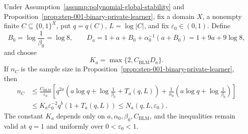 \begin{lemma}
\label{lem:step-002-sc-domination}
Under Assumption~\ref{assump:polynomial-global-stability} and
Proposition~\ref{prop:step-001-binary-private-learner}, fix a domain
\(X\), a nonempty finite \(C\subseteq\{0,1\}^X\), put
\(q=q(C)\), \(L=\log|C|\), and fix
\(\varepsilon_0\in(0,1)\).  Define
\begin{equation}
B_0=\log\frac1{\beta_0}=\log 8,
\qquad
D_a=1+a+B_0+\alpha_0^{-1}(a+B_0)
=1+9a+9\log 8,
\label{eq:app-a16}
\end{equation}
and choose
\begin{equation}
K_a=\max\{2,C_{\mathrm{BLM}}D_a\}.
\label{eq:app-a17}
\end{equation}
If \(n_C\) is the sample size in
Proposition~\ref{prop:step-001-binary-private-learner}, then
\begin{equation}
\begin{aligned}
n_C
&\leq \frac{C_{\mathrm{BLM}}}{\varepsilon_0}
\left[
q^{2a}\!\left(
a\log q+\log\frac1{\beta_0}+T_a(q,L)
\right)
+\frac1{\alpha_0}
\left(a\log q+\log\frac1{\beta_0}\right)
\right]\\
&\leq K_a\varepsilon_0^{-2}q^b(1+T_a(q,L))
\leq N_a(q,L,\varepsilon_0).
\end{aligned}
\label{eq:app-a18}
\end{equation}
The constant \(K_a\) depends only on
\(a,\alpha_0,\beta_0,C_{\mathrm{BLM}}\), and the inequalities remain
valid at \(q=1\) and uniformly over \(0<\varepsilon_0<1\).
\end{lemma}

